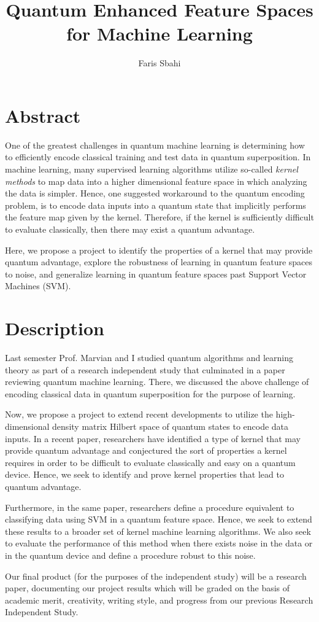 \documentclass[12]{amsart}
\title{Quantum Enhanced Feature Spaces for Machine Learning}
\author{Faris Sbahi}
\date{}
\newcommand\0{\mathbf{0}}
\newcommand\<{\langle}
\renewcommand\>{\rangle}
\begin{document}
\maketitle

\section{Abstract}

One of the greatest challenges in quantum machine learning is determining how to efficiently encode classical training and test data in quantum superposition. In machine learning, many supervised learning algorithms utilize so-called \textit{kernel methods} to map data into a higher dimensional feature space in which analyzing the data is simpler. Hence, one suggested workaround to the quantum encoding problem, is to encode data inputs into a quantum state that implicitly performs the feature map given by the kernel. Therefore, if the kernel is sufficiently difficult to evaluate classically, then there may exist a quantum advantage.

Here, we propose a project to identify the properties of a kernel that may provide quantum advantage, explore the robustness of learning in quantum feature spaces to noise, and generalize learning in quantum feature spaces past Support Vector Machines (SVM).
\section{Description}

Last semester Prof. Marvian and I studied quantum algorithms and learning theory as part of a research independent study that culminated in a paper reviewing quantum machine learning. There, we discussed the above challenge of encoding classical data in quantum superposition for the purpose of learning. 

Now, we propose a project to extend recent developments to utilize the high-dimensional density matrix Hilbert space of quantum states to encode data inputs. In a recent paper\cite{havlicek2018supervised}, researchers have identified a type of kernel that may provide quantum advantage and conjectured the sort of properties a kernel requires in order to be difficult to evaluate classically and easy on a quantum device. Hence, we seek to identify and prove kernel properties that lead to quantum advantage.

Furthermore, in the same paper, researchers define a procedure equivalent to classifying data using SVM in a quantum feature space. Hence, we seek to extend these results to a broader set of kernel machine learning algorithms. We also seek to evaluate the performance of this method when there exists noise in the data or in the quantum device and define a procedure robust to this noise.

Our final product (for the purposes of the independent study) will be a research paper, documenting our project results which will be graded on the basis of academic merit, creativity, writing style, and progress from our previous Research Independent Study.

\nocite{*}


\end{document}

